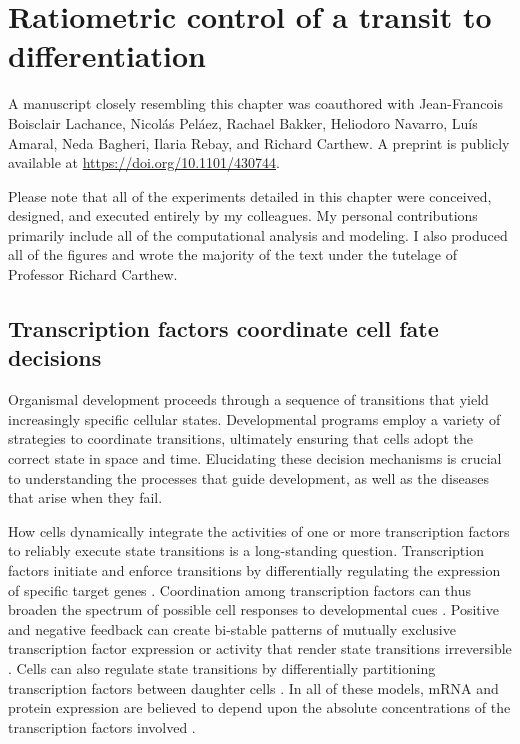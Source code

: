 
\graphicspath{ {figures/ratio/} }


\chapter{Ratiometric control of a transit to differentiation}
\label{ch:ratio}

A manuscript closely resembling this chapter was coauthored with Jean-Francois Boisclair Lachance, Nicol\'{a}s Pel\'{a}ez, Rachael Bakker, Heliodoro Navarro, Lu\'{i}s Amaral, Neda Bagheri, Ilaria Rebay, and Richard Carthew. A preprint is publicly available at \url{https://doi.org/10.1101/430744}.

Please note that all of the experiments detailed in this chapter were conceived, designed, and executed entirely by my colleagues. My personal contributions primarily include all of the computational analysis and modeling. I also produced all of the figures and wrote the majority of the text under the tutelage of Professor Richard Carthew.


\section{Transcription factors coordinate cell fate decisions}

Organismal development proceeds through a sequence of transitions that yield increasingly specific cellular states. Developmental programs employ a variety of strategies to coordinate transitions, ultimately ensuring that cells adopt the correct state in space and time. Elucidating these decision mechanisms is crucial to understanding the processes that guide development, as well as the diseases that arise when they fail.

How cells dynamically integrate the activities of one or more transcription factors to reliably execute state transitions is a long-standing question. Transcription factors initiate and enforce transitions by differentially regulating the expression of specific target genes \cite{Zheng1997,Ducy1997,McGhee2009}. Coordination among transcription factors can thus broaden the spectrum of possible cell responses to developmental cues \cite{ORiordan1999,Evans2003}. Positive and negative feedback can create bi-stable patterns of mutually exclusive transcription factor expression or activity that render state transitions irreversible \cite{Melen2005,Kueh2013,Yao2008,Park2012}. Cells can also regulate state transitions by differentially partitioning transcription factors between daughter cells \cite{Wolff2018}. In all of these models, mRNA and protein expression are believed to depend upon the absolute concentrations of the transcription factors involved \cite{Tontonoz1994,Laslo2006,Raj2010,Niwa2000}.

